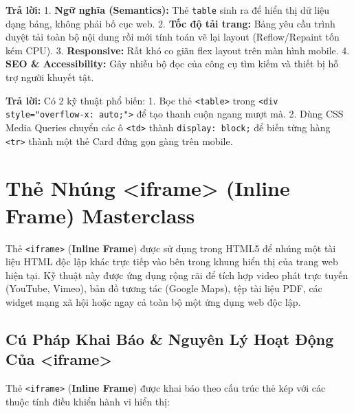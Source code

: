 \documentclass[11pt,oneside]{book}
\newcommand{\codeinline}[1]{\textcolor{accentOrange}{\texttt{#1}}}
\newcommand{\term}[1]{\textbf{\textcolor{primaryBlue}{#1}}}
\begin{document}
\begin{conceptBox}
\textbf{Trả lời:} 
1. \textbf{Ngữ nghĩa (Semantics):} Thẻ \codeinline{table} sinh ra để hiển thị dữ liệu dạng bảng, không phải bố cục web. 
2. \textbf{Tốc độ tải trang:} Bảng yêu cầu trình duyệt tải toàn bộ nội dung rồi mới tính toán vẽ lại layout (Reflow/Repaint tốn kém CPU). 
3. \textbf{Responsive:} Rất khó co giãn flex layout trên màn hình mobile. 
4. \textbf{SEO \& Accessibility:} Gây nhiễu bộ đọc của công cụ tìm kiếm và thiết bị hỗ trợ người khuyết tật.
\end{conceptBox}

\begin{conceptBox}
\textbf{Trả lời:} Có 2 kỹ thuật phổ biến:
1. Bọc thẻ \codeinline{<table>} trong \codeinline{<div style="overflow-x: auto;">} để tạo thanh cuộn ngang mượt mà.
2. Dùng CSS Media Queries chuyển các ô \codeinline{<td>} thành \codeinline{display: block;} để biến từng hàng \codeinline{<tr>} thành một thẻ Card đứng gọn gàng trên mobile.
\end{conceptBox}

\Needspace*{80pt}
\section{Thẻ Nhúng <iframe> (Inline Frame) Masterclass}
\label{sec:html_iframe_masterclass}

Thẻ \codeinline{<iframe>} (\term{Inline Frame}) được sử dụng trong HTML5 để nhúng một tài liệu HTML độc lập khác trực tiếp vào bên trong khung hiển thị của trang web hiện tại. Kỹ thuật này được ứng dụng rộng rãi để tích hợp video phát trực tuyến (YouTube, Vimeo), bản đồ tương tác (Google Maps), tệp tài liệu PDF, các widget mạng xã hội hoặc ngay cả toàn bộ một ứng dụng web độc lập.

\subsection{Cú Pháp Khai Báo \& Nguyên Lý Hoạt Động Của <iframe>}

Thẻ \codeinline{<iframe>} (\term{Inline Frame}) được khai báo theo cấu trúc thẻ kép với các thuộc tính điều khiển hành vi hiển thị:
\end{document}
